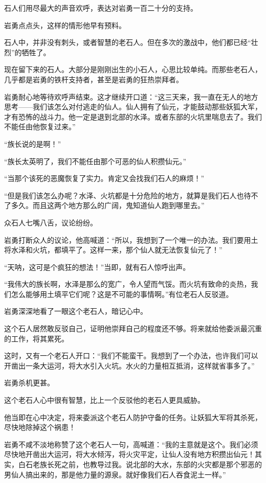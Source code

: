 \begin{this_body}
石人们用尽最大的声音欢呼，表达对岩勇一百二十分的支持。

岩勇点点头，这样的情形他早有预料。

石人中，并非没有刺头，或者智慧的老石人。但在多次的激战中，他们都已经“壮烈”的牺牲了。

现在留下来的石人。大部分是刚刚出生的小石人，心思比较单纯。而那些老石人，几乎都是岩勇的铁杆支持者，甚至是岩勇的狂热崇拜者。

岩勇耐心地等待欢呼声结束。这才继续开口道：“这三天来，我一直在无人的地方思考——我们该怎么对付逃走的仙人。仙人拥有了仙元，才能鼓动那些妖狐大军，才有恐怖的战斗力。他一定是退到北部的水泽。或者东部的火坑里喘息去了。我们不能任由他恢复过来。”

“族长说的是啊！”

“族长太英明了，我们不能任由那个可恶的仙人积攒仙元。”

“当那个该死的恶魔恢复了实力。肯定又会找我们石人的麻烦！”

“但是我们该怎么办呢？水泽、火坑都是十分危险的地方，就算是我们石人也待不了多久。而且这两个地方那么的广阔，鬼知道仙人跑到哪里去。”

众石人七嘴八舌，议论纷纷。

岩勇打断众人的议论，他高喊道：“所以，我想到了一个唯一的办法。我们要用土将水泽和火坑，都填平了。这样一来，那个仙人就无法恢复仙元了！”

“天呐，这可是个疯狂的想法！”当即，就有石人惊呼出声。

“我伟大的族长啊，水泽是那么的宽广，令人望而气馁。而火坑有致命的炎热，我们怎么能够用土填平它们呢？这是不可能的事情啊。”有位老石人反驳道。

岩勇深深地看了一眼这个老石人，暗记心中。

这个石人居然敢反驳自己，证明他崇拜自己的程度还不够。将来就给他委派最沉重的工作，将其累死。

这时，又有一个老石人开口：“我们不能蛮干。我想到了一个办法，也许我们可以开凿出一条大运河，将大水引入火坑。水火的力量相互抵消，这样就省事多了。”

岩勇杀机更甚。

这个老石人心中很有智慧，比上一个反驳他的老石人更具威胁。

他当即在心中决定，将来委派这个老石人防护守备的任务。让妖狐大军将其杀死，尽快地除掉这个祸患！

岩勇不咸不淡地称赞了这个老石人一句，高喊道：“我的主意就是这个。我们必须尽快地开凿出大运河，将大水倾泻，将火灾平定，让仙人没有地方积攒出仙元！其实，白石老族长死之前，也教导过我。说北部的大水，东部的火灾都是那个邪恶的男仙人搞出来的，那是他力量的源泉。就好像我们石人吞食泥土一样。”


\end{this_body}
